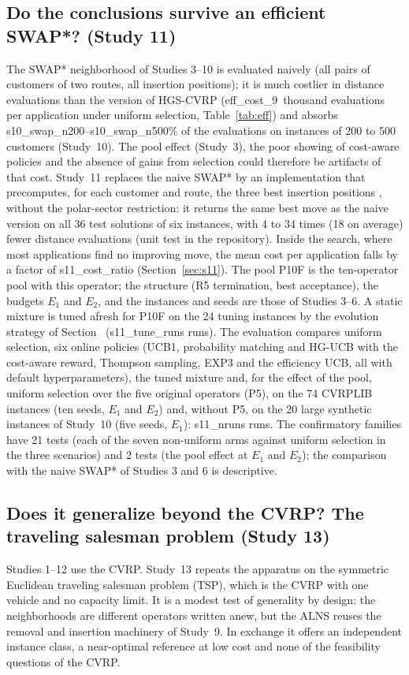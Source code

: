 \subsection{Do the conclusions survive an efficient SWAP*? (Study 11)}\label{sec:s11design}
The SWAP* neighborhood of Studies 3--10 is evaluated naively (all pairs of customers of two routes, all insertion positions); it is much costlier in distance evaluations than the version of HGS-CVRP \citep{vidal2022} (\num{eff_cost_9}~thousand evaluations per application under uniform selection, Table~\ref{tab:eff}) and absorbs \num{s10_swap_n200}--\num{s10_swap_n500}\% of the evaluations on instances of 200 to 500 customers (Study~10). The pool effect (Study~3), the poor showing of cost-aware policies and the absence of gains from selection could therefore be artifacts of that cost. Study~11 replaces the naive SWAP* by an implementation that precomputes, for each customer and route, the three best insertion positions \citep{vidal2022}, without the polar-sector restriction: it returns the same best move as the naive version on all 36 test solutions of six instances, with 4 to 34 times (18 on average) fewer distance evaluations (unit test in the repository). Inside the search, where most applications find no improving move, the mean cost per application falls by a factor of \num{s11_cost_ratio} (Section~\ref{sec:s11}). The pool P10F is the ten-operator pool with this operator; the structure (R5 termination, best acceptance), the budgets $E_1$ and $E_2$, and the instances and seeds are those of Studies 3--6. A static mixture is tuned afresh for P10F on the 24 tuning instances by the evolution strategy of Section~ (\num{s11_tune_runs} runs). The evaluation compares uniform selection, six online policies (UCB1, probability matching and HG-UCB with the cost-aware reward, Thompson sampling, EXP3 and the efficiency UCB, all with default hyperparameters), the tuned mixture and, for the effect of the pool, uniform selection over the five original operators (P5), on the 74 CVRPLIB instances (ten seeds, $E_1$ and $E_2$) and, without P5, on the 20 large synthetic instances of Study~10 (five seeds, $E_1$): \num{s11_nruns} runs. The confirmatory families have 21 tests (each of the seven non-uniform arms against uniform selection in the three scenarios) and 2 tests (the pool effect at $E_1$ and $E_2$); the comparison with the naive SWAP* of Studies 3 and 6 is descriptive.

\subsection{Does it generalize beyond the CVRP? The traveling salesman problem (Study 13)}\label{sec:s13design}
Studies 1--12 use the CVRP. Study~13 repeats the apparatus on the symmetric Euclidean traveling salesman problem (TSP), which is the CVRP with one vehicle and no capacity limit. It is a modest test of generality by design: the neighborhoods are different operators written anew, but the ALNS reuses the removal and insertion machinery of Study~9. In exchange it offers an independent instance class, a near-optimal reference at low cost and none of the feasibility questions of the CVRP.

